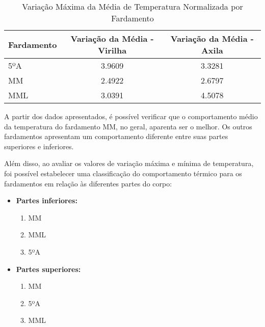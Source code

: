 
        \begin{table}[H]
            \centering
            \begin{tabular}{lcc}
            \hline
            Fardamento & Variação da Média - Virilha & Variação da Média - Axila \\
            \hline
            5ºA & 3.9609 & 3.3281 \\ 
            MM & 2.4922 & 2.6797 \\ 
            MML & 3.0391 & 4.5078 \\ 
            \hline
            \end{tabular}
            \caption{Variação Máxima da Média de Temperatura Normalizada por Fardamento}
            \label{tab:maxmedia}
            \end{table}

        A partir dos dados apresentados, é possível verificar que o comportamento médio da temperatura 
        do fardamento \acrshort{MM}, no geral, aparenta ser o melhor. Os outros fardamentos 
        apresentam um comportamento diferente entre suas partes superiores e inferiores.

        Além disso, ao avaliar os valores de variação máxima e mínima de temperatura, foi possível estabelecer 
        uma classificação do comportamento térmico para os fardamentos em relação às diferentes partes do corpo:       

        \begin{itemize}
            \item \textbf{Partes inferiores:}
            \begin{enumerate}[label=\Roman*.] %
            \item \acrlong{MM}
            \item \acrlong{MML}
            \item 5ºA
            \end{enumerate}

        
            \item \textbf{Partes superiores:}
            \begin{enumerate}[label=\Roman*.] %
            \item \acrlong{MM}
            \item 5ºA
            \item \acrlong{MML}
            \end{enumerate}

        
            \end{itemize}
            
